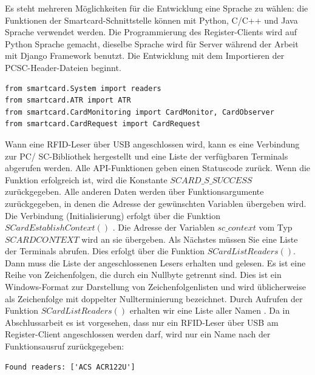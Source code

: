 Es steht mehreren Möglichkeiten für die Entwicklung eine Sprache zu wählen: die Funktionen der Smartcard-Schnittstelle können mit Python, C/C++ und Java Sprache verwendet werden. Die Programmierung des Register-Clients wird auf Python Sprache gemacht, dieselbe Sprache wird für Server während der Arbeit mit Django Framework benutzt. Die Entwicklung mit dem Importieren der PCSC-Header-Dateien beginnt. 
\begin{lstlisting}[caption={[Importieren der PCSC-Header-Dateien] },captionpos=b]
from smartcard.System import readers
from smartcard.ATR import ATR
from smartcard.CardMonitoring import CardMonitor, CardObserver
from smartcard.CardRequest import CardRequest
\end{lstlisting}
Wann eine RFID-Leser über USB angeschlossen wird, kann es eine Verbindung zur PC/ SC-Bibliothek hergestellt und eine Liste der verfügbaren Terminals abgerufen werden. Alle API-Funktionen geben einen Statuscode zurück. Wenn die Funktion erfolgreich ist, wird die Konstante  $SCARD\_S\_SUCCESS$  zurückgegeben. Alle anderen Daten werden über Funktionsargumente zurückgegeben, in denen die Adresse der gewünschten Variablen übergeben wird. Die Verbindung (Initialisierung) erfolgt über die Funktion $SCardEstablishContext()$ \cite[p. 101]{chirico:smart_card}. Die Adresse der Variablen $sc\_context$ vom Typ $SCARDCONTEXT$ wird an sie übergeben. Als Nächstes müssen Sie eine Liste der Terminals abrufen. Dies erfolgt über die Funktion $SCardListReaders()$. Dann muss die Liste der angeschlossenen Lesers erhalten und gelesen. Es ist eine Reihe von Zeichenfolgen, die durch ein Nullbyte getrennt sind. Dies ist ein Windows-Format zur Darstellung von Zeichenfolgenlisten und wird üblicherweise als Zeichenfolge mit doppelter Nullterminierung bezeichnet. Durch Aufrufen der Funktion $SCardListReaders()$ erhalten wir eine Liste aller Namen \cite[p. 102]{chirico:smart_card}. Da in Abschlussarbeit es ist vorgesehen, dass nur ein RFID-Leser über USB am Register-Client angeschlossen werden darf, wird nur ein Name nach der Funktionsausruf zurückgegeben:
\begin{lstlisting}
Found readers: ['ACS ACR122U']
\end{lstlisting}

